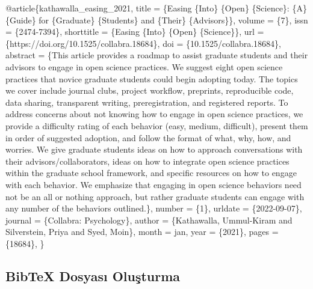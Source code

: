 \documentclass[
  oneside]{book}
\newenvironment{Shaded}{\begin{snugshade}}{\end{snugshade}}
\newcommand{\DataTypeTok}[1]{\textcolor[rgb]{0.13,0.29,0.53}{#1}}
\newcommand{\NormalTok}[1]{#1}
\newcommand{\OtherTok}[1]{\textcolor[rgb]{0.56,0.35,0.01}{#1}}
\newcommand{\StringTok}[1]{\textcolor[rgb]{0.31,0.60,0.02}{#1}}
\newcommand{\VariableTok}[1]{\textcolor[rgb]{0.00,0.00,0.00}{#1}}
\begin{document}
\begin{Shaded}
\begin{Highlighting}[]

\VariableTok{@article}\NormalTok{\{}\OtherTok{kathawalla\_easing\_2021}\NormalTok{,}
    \DataTypeTok{title}\NormalTok{ = \{Easing \{Into\} \{Open\} \{Science\}: \{A\} \{Guide\} for \{Graduate\} \{Students\} and \{Their\} \{Advisors\}\},}
    \DataTypeTok{volume}\NormalTok{ = \{7\},}
    \DataTypeTok{issn}\NormalTok{ = \{2474{-}7394\},}
    \DataTypeTok{shorttitle}\NormalTok{ = \{Easing \{Into\} \{Open\} \{Science\}\},}
    \DataTypeTok{url}\NormalTok{ = \{https://doi.org/10.1525/collabra.18684\},}
    \DataTypeTok{doi}\NormalTok{ = \{10.1525/collabra.18684\},}
    \DataTypeTok{abstract}\NormalTok{ = \{This article provides a roadmap to assist graduate students and their advisors to engage in open science practices. We suggest eight open science practices that novice graduate students could begin adopting today. The topics we cover include journal clubs, project workflow, preprints, reproducible code, data sharing, transparent writing, preregistration, and registered reports. To address concerns about not knowing how to engage in open science practices, we provide a difficulty rating of each behavior (easy, medium, difficult), present them in order of suggested adoption, and follow the format of what, why, how, and worries. We give graduate students ideas on how to approach conversations with their advisors/collaborators, ideas on how to integrate open science practices within the graduate school framework, and specific resources on how to engage with each behavior. We emphasize that engaging in open science behaviors need not be an all or nothing approach, but rather graduate students can engage with any number of the behaviors outlined.\},}
    \DataTypeTok{number}\NormalTok{ = \{1\},}
    \DataTypeTok{urldate}\NormalTok{ = \{2022{-}09{-}07\},}
    \DataTypeTok{journal}\NormalTok{ = \{Collabra: Psychology\},}
    \DataTypeTok{author}\NormalTok{ = \{Kathawalla, Ummul{-}Kiram and Silverstein, Priya and Syed, Moin\},}
    \DataTypeTok{month}\NormalTok{ = }\StringTok{jan}\NormalTok{,}
    \DataTypeTok{year}\NormalTok{ = \{2021\},}
    \DataTypeTok{pages}\NormalTok{ = \{18684\},}
\NormalTok{\}}
\end{Highlighting}
\end{Shaded}

\hypertarget{bibtex-dosyasux131-oluux15fturma}{%
\subsection{BibTeX Dosyası Oluşturma}\label{bibtex-dosyasux131-oluux15fturma}}
\end{document}
